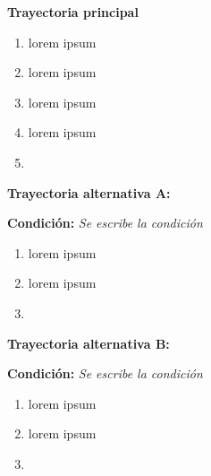 


\begin{large}
	\textbf{Trayectoria principal}\\
\end{large}	

\begin{enumerate}[1.]
	\item \actor lorem ipsum
	\item \sistema lorem ipsum
	\item \sistema lorem ipsum
	\item \sistema lorem ipsum
	\item \finCU	
\end{enumerate}



\begin{large}
	\textbf{Trayectoria alternativa A:}\\
\end{large}	
\textbf{Condición:} \textit{Se escribe la condición}
\begin{enumerate}[{A-}1.]

	\item \actor lorem ipsum
	\item \sistema lorem ipsum
	\item \finTA	

\end{enumerate}


\begin{large}
	\textbf{Trayectoria alternativa B:}\\
\end{large}	
\textbf{Condición:} \textit{Se escribe la condición}

\begin{enumerate}[{B-}1.]

	\item \actor lorem ipsum
	\item \sistema lorem ipsum
	\item \finTA	

\end{enumerate}




